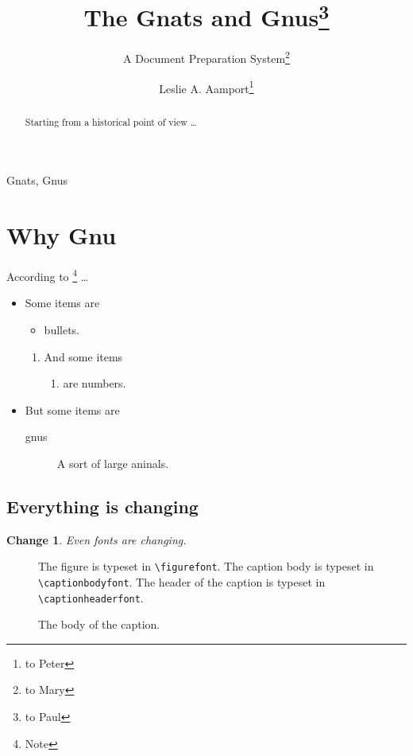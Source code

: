 
\author{Leslie A. Aamport\thanks{to Peter}}
\title{The Gnats and Gnus\thanks{to Paul}}
\subtitle{A Document Preparation System\thanks{to Mary}}

\maketitle

\begin{keywords}
Gnats, Gnus
\end{keywords}

\begin{abstract}
Starting from a historical point of view \dots
\end{abstract}

\smalltableofcontents

\section{Why Gnu}

According to \cite{book-full}\footnote{Note} \dots

\begin{itemize}
\item Some items are 
  \begin{itemize}
  \item bullets.
  \end{itemize}
  \begin{enumerate}
  \item And some items 
    \begin{enumerate}
    \item are numbers.
    \end{enumerate}
  \end{enumerate}
\item But some items are
  \begin{description}
  \item[gnus] A sort of large aninals.
  \end{description}
\end{itemize}


\subsection{Everything is changing}

\newtheorem{change}{Change}

\begin{change}
  Even fonts are changing.
\end{change}


\begin{figure}[htbp]
  \begin{center}
    \leavevmode
    The figure is typeset in \verb|\figurefont|.
    The caption body is typeset in \verb|\captionbodyfont|.
    The header of the caption is typeset in \verb|\captionheaderfont|.
  \end{center}
  \caption{The body of the caption.}
\end{figure}







